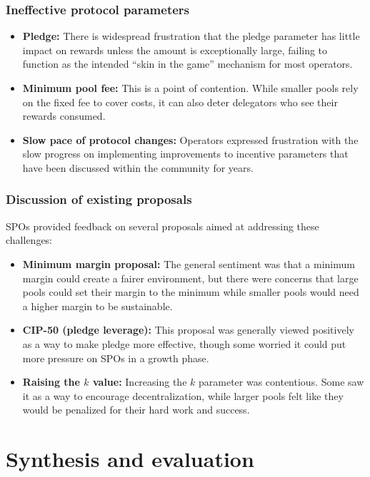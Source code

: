 \documentclass[11pt, letterpaper]{article}
\begin{document}
\subsubsection{Ineffective protocol parameters}
\begin{itemize}
	\item \textbf{Pledge:} There is widespread frustration that the pledge parameter has little impact on
	      rewards unless the amount is exceptionally large, failing to function as the intended ``skin in the game''
	      mechanism for most operators.
	\item \textbf{Minimum pool fee:} This is a point of contention. While smaller pools rely on the fixed fee
	      to cover costs, it can also deter delegators who see their rewards consumed. 
	\item \textbf{Slow pace of protocol changes:} Operators expressed frustration with the slow progress on
	      implementing improvements to incentive parameters that have been discussed within the community for years.
\end{itemize}

\subsubsection{Discussion of existing proposals}
SPOs provided feedback on several proposals aimed at addressing these
challenges:
\begin{itemize}
	\item \textbf{Minimum margin proposal:} The general sentiment was that a minimum margin could create a
	      fairer environment, but there were concerns that large pools could set their margin to the minimum while
	      smaller pools would need a higher margin to be sustainable.
	\item \textbf{CIP-50 (pledge leverage):} This proposal was generally viewed positively as a way to make
	      pledge more effective, though some worried it could put more pressure on SPOs in a growth phase.
	\item \textbf{Raising the $k$ value:} Increasing the $k$ parameter was contentious. Some saw it as a way to
	      encourage decentralization, while larger pools felt like they would be penalized for their hard work and
	      success.
\end{itemize}

\section{Synthesis and evaluation}
\label{sec:synthesis}
\end{document}
